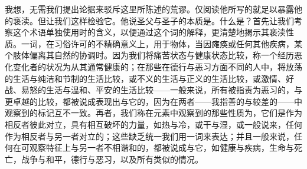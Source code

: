 我想，无需我们提出论据来驳斥这里所陈述的荒谬。仅阅读他所写的就足以暴露他的亵渎。但让我们这样检验它。他说圣父与圣子的本质是。什么是？首先让我们考察这个术语单独使用时的含义，以便通过这个词的解释，更清楚地揭示其亵渎性质。一词，在习俗许可的不精确意义上，用于物体，当因瘫痪或任何其他疾病，某个肢体偏离其自然的协调时。因为我们将痛苦状态与健康状态比较，称一个经历恶化变化者的状况为从其通常健康的；在那些在德行与恶习方面不同的人中，将放荡的生活与纯洁和节制的生活比较，或不义的生活与正义的生活比较，或激情、好战、易怒的生活与温和、平安的生活比较——一般来说，所有被指责为恶习的，与更卓越的比较，都被说成表现出与它的，因为在两者——我指善的与较差的——中观察到的标记互不一致。再者，我们称在元素中观察到的那些性质为，它们是作为相反者彼此对立，具有相互破坏的力量，如热与冷，或干与湿，或一般说来，任何作为相反者与另一者对立的；这些缺乏统一我们用一词来表达；并且一般来说，任何在可观察特征上与另一者不相谐和的，都被说成与它，如健康与疾病，生命与死亡，战争与和平，德行与恶习，以及所有类似的情况。\par

